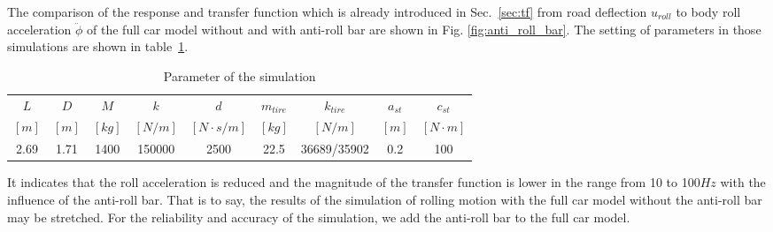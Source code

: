  The comparison of the response and transfer function which is already introduced in Sec.~\ref{sec:tf} from road deflection $u_{roll}$ to body roll acceleration $\ddot{\phi}$ of the full car model without and with anti-roll bar are shown in Fig. \ref{fig:anti_roll_bar}.
 The setting of parameters in those simulations are shown in table~\ref{tbl:par_arb.vs.fcm}.

 \begin{table}
 \centering
 \caption{Parameter of the simulation}
 \label{tbl:par_arb.vs.fcm}
 \begin{tabular}{ccccccccc}
 \hline
 $L$ & $D$ & $M$ & $k$ & $d$ & $m_{tire}$ & $k_{tire}$ & $a_{st}$ & $c_{st}$\\ 
 $[m]$ & $[m]$ & $[kg]$ & $[N/m]$ & $[N\cdot s/m]$ & $[kg]$ & $[N/m]$ & $[m]$ & $[N\cdot m]$ \\ \hline
 2.69 & 1.71 & 1400 & 150000 & 2500 & 22.5 & 36689/35902 & 0.2 & 100 \\ \hline
 \end{tabular}
 \end{table}

 It indicates that the roll acceleration is reduced and the magnitude of the transfer function is lower in the range from 10 to 100$Hz$ with the influence of the anti-roll bar.
 That is to say, the results of the simulation of rolling motion with the full car model without the anti-roll bar may be stretched.
 For the reliability and accuracy of the simulation, we add the anti-roll bar to the full car model.

